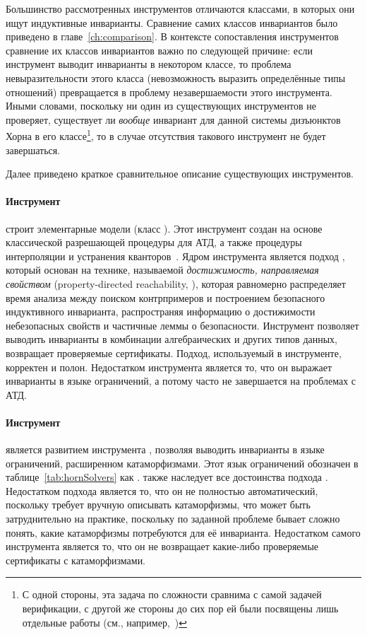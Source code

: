 Большинство рассмотренных инструментов отличаются классами, в которых они ищут индуктивные инварианты. Сравнение самих классов инвариантов было приведено в главе~\cref{ch:comparison}. В контексте сопоставления инструментов сравнение их классов инвариантов важно по следующей причине: если инструмент выводит инварианты в некотором классе, то проблема невыразительности этого класса (невозможность выразить определённые типы отношений) превращается в проблему незавершаемости этого инструмента. Иными словами, поскольку ни один из существующих инструментов не проверяет, существует ли \emph{вообще} инвариант для данной системы дизъюнктов Хорна в его классе\footnote{С одной стороны, эта задача по сложности сравнима с самой задачей верификации, с другой же стороны до сих пор ей были посвящены лишь отдельные работы (см., например,~\cite{10.1145/3022187,10.1145/2837614.2837640})}, то в случае отсутствия такового инструмент не будет завершаться.

Далее приведено краткое сравнительное описание существующих инструментов.

\paragraph{Инструмент \spacer{}~\cite{komuravelli2016smt}} строит элементарные модели (класс \elemclass{}). Этот инструмент создан на основе классической разрешающей процедуры для АТД, а также процедуры интерполяции и устранения кванторов~\cite{bjorner2015playing}. Ядром инструмента является подход \spacer{}, который основан на технике, называемой \emph{достижимость, направляемая свойством} \foreignlanguage{english}{(property-directed reachability, \pdr{})}, которая равномерно распределяет время анализа между поиском контрпримеров и построением безопасного индуктивного инварианта, распространяя информацию о достижимости небезопасных свойств и частичные леммы о безопасности. Инструмент позволяет выводить инварианты в комбинации алгебраических и других типов данных, возвращает проверяемые сертификаты. Подход, используемый в инструменте, корректен и полон. Недостатком инструмента является то, что он выражает инварианты в языке ограничений, а потому часто не завершается на проблемах с АТД.

\paragraph{Инструмент \racer{}~\cite{10.1145/3498722}} является развитием инструмента \spacer{}, позволяя выводить инварианты в языке ограничений, расширенном катаморфизмами. Этот язык ограничений обозначен в таблице~\ref{tab:hornSolvers} как \catelemclass{}. \racer{} также наследует все достоинства подхода \spacer{}. Недостатком подхода является то, что он не полностью автоматический, поскольку требует вручную описывать катаморфизмы, что может быть затруднительно на практике, поскольку по заданной проблеме бывает сложно понять, какие катаморфизмы потребуются для её инварианта. Недостатком самого инструмента является то, что он не возвращает какие-либо проверяемые сертификаты с катаморфизмами.

